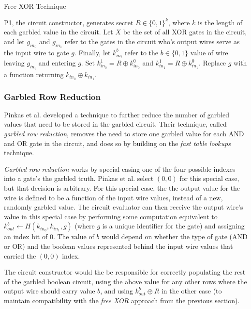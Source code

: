 \begin{algorithm}[H]
    \caption{Free XOR Technique}
    \label{alg:freexor}
    \begin{algorithmic}[1]
        \STATE \ac{P1}, the circuit constructor, generates secret $R \in \{0, 1\}^{k}$, where $k$ is the length of each garbled value in the circuit.
        \STATE Let $X$ be the set of all XOR gates in the circuit, and let $g_{in_0}$ and $g_{in_1}$ refer to the gates in the circuit who's output wires serve as the input wire to gate $g$. Finally, let $k^b_{in_i}$ refer to the $b \in \{0, 1\}$ value of wire leaving $g_{in_i}$ and entering $g$.
            \STATE Set $k^1_{in_0} =  R \oplus k^0_{in_0}$ and $k^1_{in_1} =  R \oplus k^0_{in_1}$.
            \STATE Replace $g$ with a function returning $k_{in_0} \oplus k_{in_1}$.
        \ENDFOR
    \end{algorithmic}
\end{algorithm}


\subsubsection{Garbled Row Reduction}

Pinkas et al.\cite{pinkas2009secure} developed a technique to further reduce the number of garbled values that need to be stored in the garbled circuit.  Their technique, called \emph{garbled row reduction}, removes the need to store one garbled value for each AND and OR gate in the circuit, and does so by building on the \emph{fast table lookups} technique.

\emph{Garbled row reduction} works by special casing one of the four possible indexes into a gate's the garbled truth.  Pinkas et al. select $(0, 0)$ for this special case, but that decision is arbitrary.  For this special case, the the output value for the wire is defined to be a function of the input wire values, instead of a new, randomly garbled value. The circuit evaluator can then receive the output wire's value in this special case by performing some computation equivalent to $k^b_{out} \gets H(k_{in_0}, k_{in_1}, g)$ (where $g$ is a unique identifier for the gate) and assigning an index bit of 0. The value of $b$ would depend on whether the type of gate (AND or OR) and the boolean values represented behind the input wire values that carried the $(0, 0)$ index.

The circuit constructor would the be responsible for correctly populating the rest of the garbled boolean circuit, using the above value for any other rows where the output wire should carry value $b$, and using $k^b_{out} \oplus R$ in the other case (to maintain compatibility with the \emph{free XOR} approach from the previous section).


